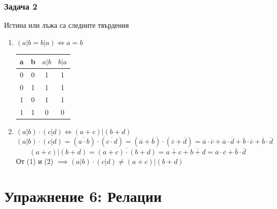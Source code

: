 \documentclass[fleqn, 12pt]{article}
\theoremstyle{definition}
\begin{document}
\subsubsection*{Задача 2}
Истина или лъжа са следните твърдения 
\begin{enumerate}
\item $(a \vert b = b \vert a) \Leftrightarrow a = b$ 
\begin{table}[htp]
\begin{center}
\begin{tabular}{|c|c|c|c|} 
\hline
a & b & $a \vert b$ & $b \vert a$\\
\hline
0 & 0 & 1 & 1 \\
\hline
0 & 1 & 1 & 1 \\
\hline
1 & 0 & 1 & 1 \\
\hline
1 & 1 & 0 & 0 \\
\hline
\end{tabular}
\end{center}
\end{table}
\item $(a \vert b) \cdot (c \vert d) \Leftrightarrow (a+c) \vert (b+d) $
\begin{equation}
(a \vert b) \cdot (c \vert d) =
 (\overline{a \cdot b}) \cdot (\overline{c \cdot d}) = 
(\overline{a} + \overline{b}) \cdot (\overline{c} + \overline{d}) = 
\overline{a} \cdot \overline{c} + \overline{a} \cdot \overline{d} + \overline{b} \cdot \overline{c} + \overline{b} \cdot \overline{d}
\end{equation}
\begin{equation}
(a+c) \vert (b+d) = 
\overline{(a+c) \cdot (b+d)} =
\overline{a+c} + \overline{b + d} = 
\overline{a} \cdot \overline{c} + \overline{b} \cdot \overline{d}
\end{equation}
От (1) и (2) $\implies (a \vert b) \cdot (c \vert d) \neq (a+c) \vert (b+d)$
\end{enumerate}
\newpage
\section{Упражнение 6: Релации }
\end{document}
